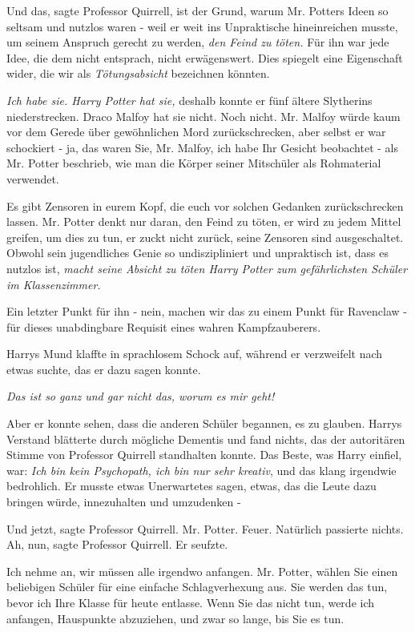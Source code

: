 \glqq Und das\grqq{}, sagte Professor Quirrell, \glqq ist der Grund, warum Mr.
Potters Ideen so seltsam und nutzlos waren - weil er weit ins Unpraktische
hineinreichen musste, um seinem Anspruch gerecht zu werden, \emph{den Feind zu
töten.} Für ihn war jede Idee, die dem nicht entsprach, nicht erwägenswert. Dies
spiegelt eine Eigenschaft wider, die wir als \emph{Tötungsabsicht} bezeichnen
könnten.

\emph{Ich habe sie. Harry Potter hat sie,} deshalb konnte er fünf ältere
Slytherins niederstrecken. Draco Malfoy hat sie nicht. Noch nicht. Mr. Malfoy
würde kaum vor dem Gerede über gewöhnlichen Mord zurückschrecken, aber selbst er
war schockiert - ja, das waren Sie, Mr. Malfoy, ich habe Ihr Gesicht beobachtet
- als Mr. Potter beschrieb, wie man die Körper seiner Mitschüler als Rohmaterial
verwendet.

Es gibt Zensoren in eurem Kopf, die euch vor solchen Gedanken zurückschrecken
lassen. Mr. Potter denkt nur daran, den Feind zu töten, er wird zu jedem Mittel
greifen, um dies zu tun, er zuckt nicht zurück, seine Zensoren sind
ausgeschaltet. Obwohl sein jugendliches Genie so undiszipliniert und unpraktisch
ist, dass es nutzlos ist, \emph{macht seine Absicht zu töten Harry Potter zum
gefährlichsten Schüler im Klassenzimmer.}

Ein letzter Punkt für ihn - nein, machen wir das zu einem Punkt für Ravenclaw -
für dieses unabdingbare Requisit eines wahren Kampfzauberers.\grqq{}

Harrys Mund klaffte in sprachlosem Schock auf, während er verzweifelt nach etwas
suchte, das er dazu sagen konnte.

\emph{Das ist so ganz und gar nicht das, worum es mir geht!}

Aber er konnte sehen, dass die anderen Schüler begannen, es zu glauben. Harrys
Verstand blätterte durch mögliche Dementis und fand nichts, das der autoritären
Stimme von Professor Quirrell standhalten konnte. Das Beste, was Harry einfiel,
war: \emph{\glqq Ich bin kein Psychopath, ich bin nur sehr kreativ\grqq{}},
und das klang irgendwie bedrohlich. Er musste etwas Unerwartetes sagen, etwas,
das die Leute dazu bringen würde, innezuhalten und umzudenken -

\glqq Und jetzt\grqq{}, sagte Professor Quirrell. \glqq Mr. Potter.
Feuer.\grqq{} Natürlich passierte nichts. \glqq Ah, nun\grqq{}, sagte Professor
Quirrell. Er seufzte.

\glqq Ich nehme an, wir müssen alle irgendwo anfangen. Mr. Potter, wählen Sie
einen beliebigen Schüler für eine einfache Schlagverhexung aus. Sie werden das
tun, bevor ich Ihre Klasse für heute entlasse. Wenn Sie das nicht tun, werde ich
anfangen, Hauspunkte abzuziehen, und zwar so lange, bis Sie es tun.\grqq{}

